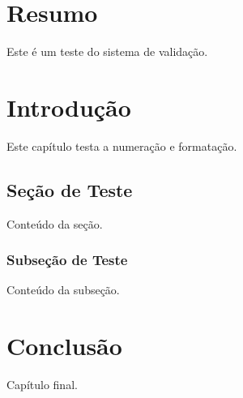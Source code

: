 \documentclass[mestrado]{UnB-PPGT}
\begin{document}


\diagnosticoppgt
\statusppgt

\validarppgt

\testeppgt

\pretextual

\chapter*{Resumo}
Este é um teste do sistema de validação.

\textual

\chapter{Introdução}
Este capítulo testa a numeração e formatação.

\section{Seção de Teste}
Conteúdo da seção.

\subsection{Subseção de Teste}
Conteúdo da subseção.

\chapter{Conclusão}
Capítulo final.
\end{document}
